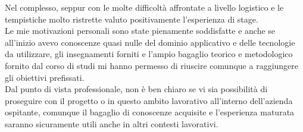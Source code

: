 Nel complesso, seppur con le molte difficoltà affrontate a livello logistico e le tempistiche molto ristrette valuto positivamente l'esperienza di stage. \\
Le mie motivazioni personali sono state pienamente soddisfatte e anche se all'inizio avevo conoscenze quasi nulle del dominio applicativo e delle tecnologie da utilizzare, gli insegnamenti forniti e l'ampio bagaglio teorico e metodologico fornito dal corso di studi mi hanno permesso di riuscire comunque a raggiungere gli obiettivi prefissati.\\
Dal punto di vista professionale, non è ben chiaro se vi sia possibilità di proseguire con il progetto o in questo ambito lavorativo all'interno dell'azienda ospitante, comunque il bagaglio di conoscenze acquisite e l'esperienza maturata saranno sicuramente utili anche in altri contesti lavorativi.